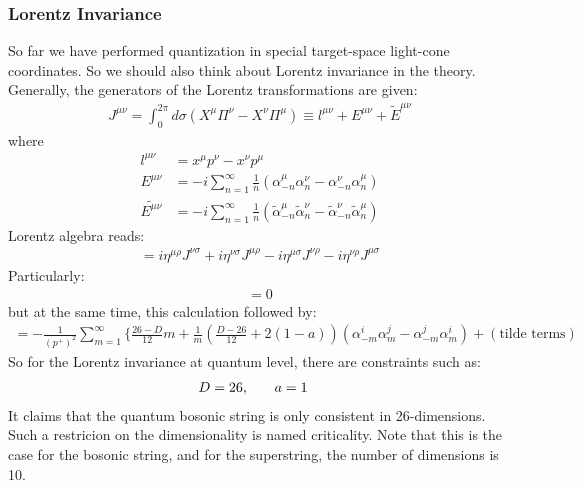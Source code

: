 \subsubsection{Lorentz Invariance}
So far we have performed quantization in special target-space light-cone coordinates. So we should also think about Lorentz invariance in the theory. Generally, the generators of the Lorentz transformations are given:
\begin{align}
    J^{\mu \nu} = \int _{0}^{2\pi} d\sigma (X^{\mu} \Pi ^{\nu} - X^{\nu} \Pi ^{\mu}) \equiv l^{\mu\nu} + E^{\mu\nu}+ \tilde{E}^{\mu\nu}
\end{align}
where
\begin{align}
    l ^{\mu\nu} &= x^{\mu} p^{\nu} - x^{\nu}p^{\mu} \\
    E^{\mu\nu} &= -i\sum_{n=1}^{\infty} \frac{1}{n} (\alpha_{-n}^{\mu}\alpha_{n}^{\nu} - \alpha_{-n}^{\nu} \alpha_{n}^{\mu}) \\
    \tilde{E^{\mu\nu}} &= -i\sum_{n=1}^{\infty} \frac{1}{n} (\tilde{\alpha}_{-n}^{\mu}\tilde{\alpha}_{n}^{\nu} - \tilde{\alpha}_{-n}^{\nu} \tilde{\alpha}_{n}^{\mu})
\end{align}
Lorentz algebra reads:
\begin{align}
    [J^{\mu\nu}, J^{\rho\sigma}] = i\eta ^{\mu\rho}J^{\nu\sigma} + i\eta^{\nu\sigma}J^{\mu\rho} - i\eta^{\mu\sigma}J^{\nu\rho} - i\eta^{\nu\rho}J^{\mu\sigma}
\end{align}
Particularly:
\begin{align}
    [J^{-i},J^{j}] = 0
\end{align}
but at the same time, this calculation followed by:
\begin{align}
    [J^{-i},J^{-j}] = -\frac{1}{(p^{+})^{2}} \sum_{m=1}^{\infty} \lbrace \frac{26-D}{12}m + \frac{1}{m}(\frac{D-26}{12} + 2(1-a))(\alpha_{-m}^{i} \alpha_{m}^{j} - \alpha_{-m}^{j} \alpha_{m}^{i}) + (\text{tilde terms}) 
\end{align}
So for the Lorentz invariance at quantum level, there are constraints such as:
\begin{align}
    D=26, & \qq{} a=1
\end{align}
It claims that the quantum bosonic string is only consistent in 26-dimensions. Such a restricion on the dimensionality is named criticality. Note that this is the case for the bosonic string, and for the superstring, the number of dimensions is 10.

